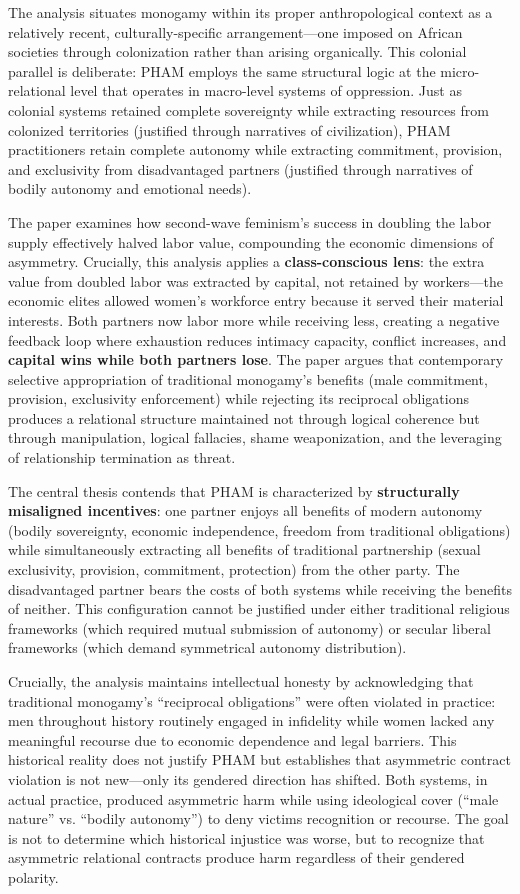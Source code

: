 \documentclass[12pt,openany]{book}
\numberwithin{equation}{chapter}
\begin{document}
The analysis situates monogamy within its proper anthropological context as a relatively recent, culturally-specific arrangement---one imposed on African societies through colonization rather than arising organically. This colonial parallel is deliberate: PHAM employs the same structural logic at the micro-relational level that operates in macro-level systems of oppression. Just as colonial systems retained complete sovereignty while extracting resources from colonized territories (justified through narratives of civilization), PHAM practitioners retain complete autonomy while extracting commitment, provision, and exclusivity from disadvantaged partners (justified through narratives of bodily autonomy and emotional needs).

The paper examines how second-wave feminism's success in doubling the labor supply effectively halved labor value, compounding the economic dimensions of asymmetry. Crucially, this analysis applies a \textbf{class-conscious lens}: the extra value from doubled labor was extracted by capital, not retained by workers---the economic elites allowed women's workforce entry because it served their material interests. Both partners now labor more while receiving less, creating a negative feedback loop where exhaustion reduces intimacy capacity, conflict increases, and \textbf{capital wins while both partners lose}. The paper argues that contemporary selective appropriation of traditional monogamy's benefits (male commitment, provision, exclusivity enforcement) while rejecting its reciprocal obligations produces a relational structure maintained not through logical coherence but through manipulation, logical fallacies, shame weaponization, and the leveraging of relationship termination as threat.

The central thesis contends that PHAM is characterized by \textbf{structurally misaligned incentives}: one partner enjoys all benefits of modern autonomy (bodily sovereignty, economic independence, freedom from traditional obligations) while simultaneously extracting all benefits of traditional partnership (sexual exclusivity, provision, commitment, protection) from the other party. The disadvantaged partner bears the costs of both systems while receiving the benefits of neither. This configuration cannot be justified under either traditional religious frameworks (which required mutual submission of autonomy) or secular liberal frameworks (which demand symmetrical autonomy distribution).

Crucially, the analysis maintains intellectual honesty by acknowledging that traditional monogamy's ``reciprocal obligations'' were often violated in practice: men throughout history routinely engaged in infidelity while women lacked any meaningful recourse due to economic dependence and legal barriers. This historical reality does not justify PHAM but establishes that asymmetric contract violation is not new---only its gendered direction has shifted. Both systems, in actual practice, produced asymmetric harm while using ideological cover (``male nature'' vs. ``bodily autonomy'') to deny victims recognition or recourse. The goal is not to determine which historical injustice was worse, but to recognize that asymmetric relational contracts produce harm regardless of their gendered polarity.
\end{document}
